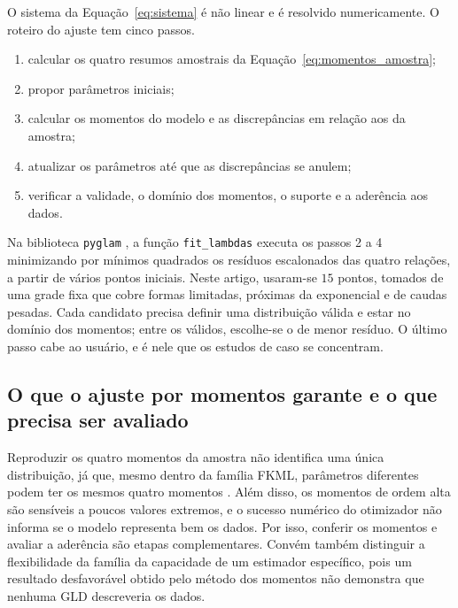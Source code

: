 O sistema da Equação~\eqref{eq:sistema} é não linear e é resolvido numericamente. O roteiro do ajuste tem cinco passos.
\begin{enumerate}
    \item calcular os quatro resumos amostrais da Equação~\eqref{eq:momentos_amostra};
    \item propor parâmetros iniciais;
    \item calcular os momentos do modelo e as discrepâncias em relação aos da amostra;
    \item atualizar os parâmetros até que as discrepâncias se anulem;
    \item verificar a validade, o domínio dos momentos, o suporte e a aderência aos dados.
\end{enumerate}
Na biblioteca \texttt{pyglam} \parencite{pyglam}, a função \texttt{fit\_lambdas} executa os passos 2 a 4 minimizando por mínimos quadrados os resíduos escalonados das quatro relações, a partir de vários pontos iniciais. Neste artigo, usaram-se $15$ pontos, tomados de uma grade fixa que cobre formas limitadas, próximas da exponencial e de caudas pesadas. Cada candidato precisa definir uma distribuição válida e estar no domínio dos momentos; entre os válidos, escolhe-se o de menor resíduo. O último passo cabe ao usuário, e é nele que os estudos de caso se concentram.

\subsection{O que o ajuste por momentos garante e o que precisa ser avaliado}

Reproduzir os quatro momentos da amostra não identifica uma única distribuição, já que, mesmo dentro da família FKML, parâmetros diferentes podem ter os mesmos quatro momentos \parencite{KingGld}. Além disso, os momentos de ordem alta são sensíveis a poucos valores extremos, e o sucesso numérico do otimizador não informa se o modelo representa bem os dados. Por isso, conferir os momentos e avaliar a aderência são etapas complementares. Convém também distinguir a flexibilidade da família da capacidade de um estimador específico, pois um resultado desfavorável obtido pelo método dos momentos não demonstra que nenhuma GLD descreveria os dados.
